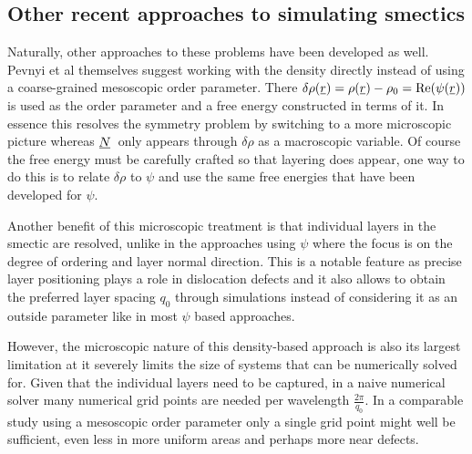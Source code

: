 \documentclass[12pt]{article}
\newcommand{\suf}[2]{\stackunder[0.5pt]{\stackunder[1pt]{\ensuremath{#1}}{\rule{\widthof{\ensuremath{#2}}*\real{0.9}}{.1ex}}}{}}
\newcommand{\su}[1]{\suf{#1}{#1}}
\newcommand{\NN}{\ensuremath{\su{N}}}
\begin{document}
    \subsection{Other recent approaches to simulating smectics}\label{sec:intro_sm_other}
        Naturally, other approaches to these problems have been developed as well.
        Pevnyi et al themselves suggest working with the density directly instead of using a coarse-grained mesoscopic order parameter\cite{pevnyiModelingSmecticLayers2014,xiaStructuralLandscapesGeometrically2021,farrellFiniteelementDiscretizationSmectic2023,xiaSimpleTensorialTheory2024}.
        There $\delta\rho(\su{r}) = \rho(\su{r}) - \rho_0 = \Re(\psi(\su{r}))$ is used as the order parameter and a free energy constructed in terms of it.
        In essence this resolves the symmetry problem by switching to a more microscopic picture whereas \NN\ only appears through $\delta\rho$ as a macroscopic variable.
        Of course the free energy must be carefully crafted so that layering does appear, one way to do this is to relate $\delta\rho$ to $\psi$ and use the same free energies that have been developed for $\psi$\cite{pevnyiModelingSmecticLayers2014}.

        Another benefit of this microscopic treatment is that individual layers in the smectic are resolved, unlike in the approaches using $\psi$ where the focus is on the degree of ordering and layer normal direction.
        This is a notable feature as precise layer positioning plays a role in dislocation defects  and it also allows to obtain the preferred layer spacing $q_0$ through simulations instead of considering it as an outside parameter like in most $\psi$ based approaches.

        However, the microscopic nature of this density-based approach is also its largest limitation at it severely limits the size of systems that can be numerically solved for.
        Given that the individual layers need to be captured, in a naive numerical solver many numerical grid points are needed per wavelength $\frac{2\pi}{q_0}$.
        In a comparable study using a mesoscopic order parameter only a single grid point might well be sufficient, even less in more uniform areas and perhaps more near defects.
\end{document}
